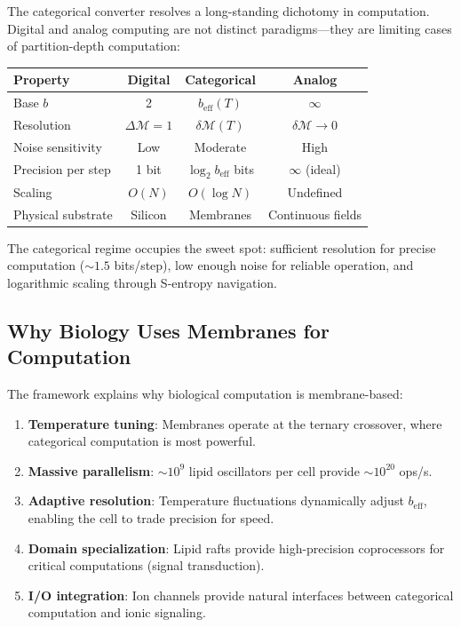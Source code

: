 \documentclass[twocolumn,10pt]{article}
\theoremstyle{remark}
\newcommand{\Depth}{\mathcal{M}}
\begin{document}
The categorical converter resolves a long-standing dichotomy in computation. Digital and analog computing are not distinct paradigms---they are limiting cases of partition-depth computation:

\begin{center}
\begin{tabular}{lccc}
\toprule
Property & Digital & Categorical & Analog \\
\midrule
Base $b$ & 2 & $b_{\text{eff}}(T)$ & $\infty$ \\
Resolution & $\Delta\Depth = 1$ & $\delta\Depth(T)$ & $\delta\Depth \to 0$ \\
Noise sensitivity & Low & Moderate & High \\
Precision per step & 1 bit & $\log_2 b_{\text{eff}}$ bits & $\infty$ (ideal) \\
Scaling & $O(N)$ & $O(\log N)$ & Undefined \\
Physical substrate & Silicon & Membranes & Continuous fields \\
\bottomrule
\end{tabular}
\end{center}

The categorical regime occupies the sweet spot: sufficient resolution for precise computation ($\sim 1.5$ bits/step), low enough noise for reliable operation, and logarithmic scaling through S-entropy navigation.

\subsection{Why Biology Uses Membranes for Computation}

The framework explains why biological computation is membrane-based:

\begin{enumerate}
    \item \textbf{Temperature tuning}: Membranes operate at the ternary crossover, where categorical computation is most powerful.

    \item \textbf{Massive parallelism}: $\sim 10^9$ lipid oscillators per cell provide $\sim 10^{20}$ ops/s.

    \item \textbf{Adaptive resolution}: Temperature fluctuations dynamically adjust $b_{\text{eff}}$, enabling the cell to trade precision for speed.

    \item \textbf{Domain specialization}: Lipid rafts provide high-precision coprocessors for critical computations (signal transduction).

    \item \textbf{I/O integration}: Ion channels provide natural interfaces between categorical computation and ionic signaling.
\end{enumerate}
\end{document}
